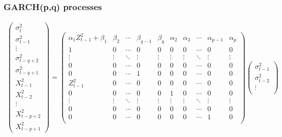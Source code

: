 \documentclass{beamer}
\begin{document}
\begin{frame}
  \frametitle{GARCH(p,q) processes}
  \begin{tiny}
    \begin{eqnarray*}
      \begin{pmatrix}
        \sigma_{t}^2 \\
        \sigma_{t-1}^2 \\
        \vdots \\
        \sigma_{t-q+2}^2 \\
        \sigma_{t-q+1}^2 \\
        X_{t-1}^2 \\
        X_{t-2}^2 \\
        \vdots \\
        X_{t-p+2}^2 \\
        X_{t-p+1}^2
      \end{pmatrix}
      =
      \begin{pmatrix}
        \alpha_1 Z_{t-1}^2 + \beta_1 & \beta_2 & \cdots &
        \beta_{q-1} & \beta_q & \alpha_2 & \alpha_3 & \cdots & \alpha_{p-1} & \alpha_p \\
        1 & 0 & \cdots & 
        0 & 0 & 0 & 0 & \cdots & 0 & 0 \\
        \vdots & \vdots & \ddots & 
        \vdots & \vdots & \vdots & \vdots & \ddots & \vdots & \vdots \\
        0 & 0 & \cdots &
        0 & 0 & 0 & 0 & \cdots & 0 & 0 \\
        0 & 0 & \cdots &
        1 & 0 & 0 & 0 & \cdots & 0 & 0 \\
        Z_{t-1}^2 & 0 & \cdots &
        0 & 0 & 0 & 0 & \cdots & 0 & 0 \\
        0 & 0 & \cdots &
        0 & 0 & 1 & 0 & \cdots & 0 & 0 \\
        \vdots & \vdots & \ddots &
        \vdots & \vdots & \vdots & \vdots & \ddots & \vdots & \vdots \\
        0 & 0 & \cdots &
        0 & 0 & 0 & 0 & \cdots & 0 & 0 \\    
        0 & 0 & \cdots &
        0 & 0 & 0 & 0 & \cdots & 1 & 0 \\    
      \end{pmatrix}
      \begin{pmatrix}
        \sigma_{t-1}^2 \\
        \sigma_{t-2}^2 \\
        \vdots \\

\end{pmatrix}
\end{eqnarray*}
\end{tiny}
\end{frame}
\end{document}
